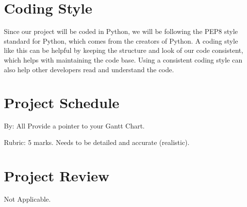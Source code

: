 \documentclass{article}
\begin{document}
\section{Coding Style}

Since our project will be coded in Python, we will be following the PEP8
style standard for Python, which comes from the creators of Python. 
A coding style like this can be helpful by keeping the structure and look of
our code consistent, which helps with maintaining the code base. Using a 
consistent coding style can also help other developers read and understand the 
code.

\section{Project Schedule}
By: All
Provide a pointer to your Gantt Chart.

Rubric:  5 marks.  Needs to be detailed and accurate (realistic).

\section{Project Review}
Not Applicable.
\end{document}
